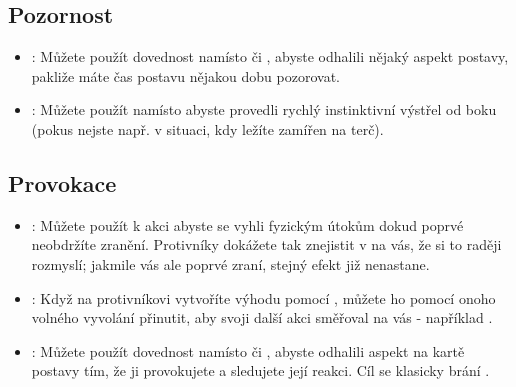 \subsection{Pozornost}
\label{sec:trik-pozornost}
\begin{itemize}

\item{}:
\label{sec:pozornost-ctenar}
Můžete použít dovednost  namísto  či , abyste odhalili nějaký aspekt postavy, pakliže máte čas postavu nějakou dobu pozorovat.

\item{}:
\label{sec:pozornost-strelba}
Můžete použít  namísto  abyste provedli rychlý instinktivní výstřel od boku (pokus nejste např. v situaci, kdy ležíte zamířen na terč).
\end{itemize}

\subsection{Provokace}
\label{sec:trik-provokace}
\begin{itemize}
  
\item{}:
\label{sec:provokace-zbroj}
Můžete použít  k akci  abyste se vyhli fyzickým útokům dokud poprvé neobdržíte zranění. Protivníky dokážete tak znejistit v  na vás, že si to raději rozmyslí; jakmile vás ale poprvé zraní, stejný efekt již nenastane.

\item{}:
\label{sec:provokace-cos}
Když na protivníkovi vytvoříte výhodu pomocí , můžete ho pomocí onoho volného vyvolání přinutit, aby svoji další akci směřoval na vás - například .

\item{}:
\label{sec:provokace-stourani}
Můžete použít dovednost  namísto  či , abyste odhalili aspekt na kartě postavy tím, že ji provokujete a sledujete její reakci. Cíl se klasicky brání .
\end{itemize}


